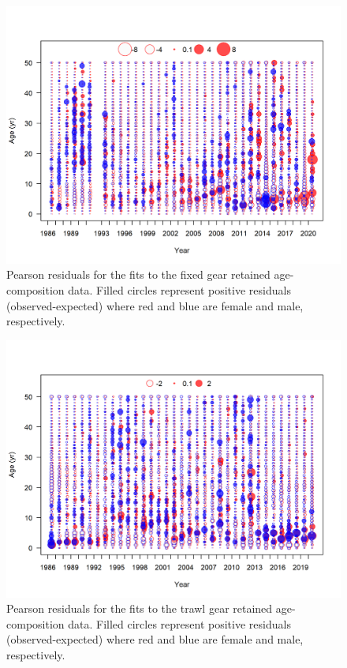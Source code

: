 \documentclass[11pt,
  english,
  a4paper,
]{article}
\begin{document}
\begin{figure}
\centering
\includegraphics[width=1\textwidth,height=1\textheight]{figs/comp_agefit_residsflt1mkt2_page3.png}
\caption{Pearson residuals for the fits to the fixed gear retained age-composition data. Filled circles represent positive residuals (observed-expected) where red and blue are female and male, respectively. \label{fig:acomp_resid_1}}
\end{figure}

\tagmcend\tagstructend


\begin{figure}
\centering
\includegraphics[width=1\textwidth,height=1\textheight]{figs/comp_agefit_residsflt3mkt2_page3.png}
\caption{Pearson residuals for the fits to the trawl gear retained age-composition data. Filled circles represent positive residuals (observed-expected) where red and blue are female and male, respectively. \label{fig:acomp_resid_3}}
\end{figure}
\end{document}
